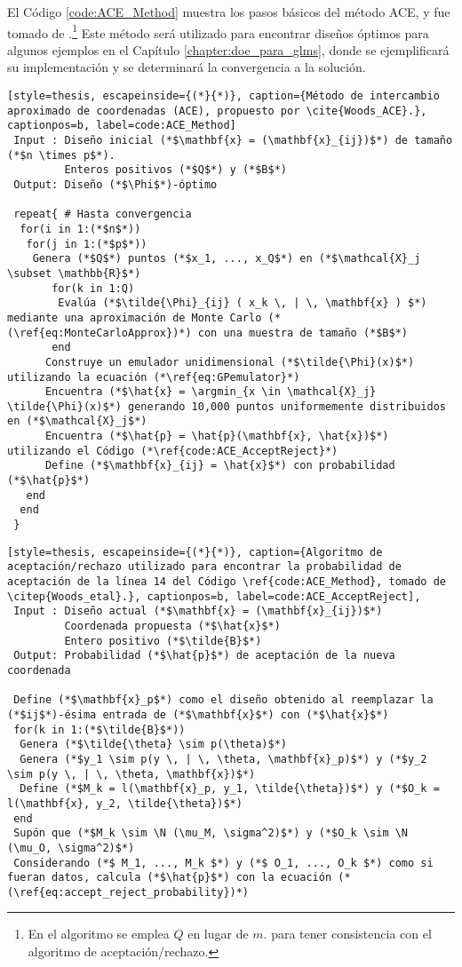 El Código \ref{code:ACE_Method} muestra los pasos básicos del método ACE, y fue tomado de \citep{Woods_etal}.\footnote{En el algoritmo se emplea $Q$ en lugar de $m$. para tener consistencia con el algoritmo de aceptación/rechazo.} Este método será utilizado para encontrar diseños óptimos para algunos ejemplos en el Capítulo \ref{chapter:doe_para_glms}, donde se ejemplificará su implementación y se determinará la convergencia a la solución.

\vskip 0.5cm

\begin{lstlisting}[style=thesis, escapeinside={(*}{*)}, caption={Método de intercambio aproximado de coordenadas (ACE), propuesto por \cite{Woods_ACE}.}, captionpos=b, label=code:ACE_Method]
 Input : Diseño inicial (*$\mathbf{x} = (\mathbf{x}_{ij})$*) de tamaño (*$n \times p$*).
         Enteros positivos (*$Q$*) y (*$B$*)
 Output: Diseño (*$\Phi$*)-óptimo
 
 repeat{ # Hasta convergencia
  for(i in 1:(*$n$*))
   for(j in 1:(*$p$*))
    Genera (*$Q$*) puntos (*$x_1, ..., x_Q$*) en (*$\mathcal{X}_j \subset \mathbb{R}$*)
       for(k in 1:Q)
        Evalúa (*$\tilde{\Phi}_{ij} ( x_k \, | \, \mathbf{x} ) $*) mediante una aproximación de Monte Carlo (*(\ref{eq:MonteCarloApprox})*) con una muestra de tamaño (*$B$*)
       end
      Construye un emulador unidimensional (*$\tilde{\Phi}(x)$*) utilizando la ecuación (*\ref{eq:GPemulator}*)
      Encuentra (*$\hat{x} = \argmin_{x \in \mathcal{X}_j} \tilde{\Phi}(x)$*) generando 10,000 puntos uniformemente distribuidos en (*$\mathcal{X}_j$*)
      Encuentra (*$\hat{p} = \hat{p}(\mathbf{x}, \hat{x})$*) utilizando el Código (*\ref{code:ACE_AcceptReject}*)
      Define (*$\mathbf{x}_{ij} = \hat{x}$*) con probabilidad (*$\hat{p}$*)
   end
  end
 }
\end{lstlisting}

\vskip 0.5cm

\begin{lstlisting}[style=thesis, escapeinside={(*}{*)}, caption={Algoritmo de aceptación/rechazo utilizado para encontrar la probabilidad de aceptación de la línea 14 del Código \ref{code:ACE_Method}, tomado de \citep{Woods_etal}.}, captionpos=b, label=code:ACE_AcceptReject],
 Input : Diseño actual (*$\mathbf{x} = (\mathbf{x}_{ij})$*)
         Coordenada propuesta (*$\hat{x}$*)
         Entero positivo (*$\tilde{B}$*)
 Output: Probabilidad (*$\hat{p}$*) de aceptación de la nueva coordenada
 
 Define (*$\mathbf{x}_p$*) como el diseño obtenido al reemplazar la (*$ij$*)-ésima entrada de (*$\mathbf{x}$*) con (*$\hat{x}$*)
 for(k in 1:(*$\tilde{B}$*))
  Genera (*$\tilde{\theta} \sim p(\theta)$*)
  Genera (*$y_1 \sim p(y \, | \, \theta, \mathbf{x}_p)$*) y (*$y_2 \sim p(y \, | \, \theta, \mathbf{x})$*)
  Define (*$M_k = l(\mathbf{x}_p, y_1, \tilde{\theta})$*) y (*$O_k = l(\mathbf{x}, y_2, \tilde{\theta})$*)
 end
 Supón que (*$M_k \sim \N (\mu_M, \sigma^2)$*) y (*$O_k \sim \N (\mu_O, \sigma^2)$*)
 Considerando (*$ M_1, ..., M_k $*) y (*$ O_1, ..., O_k $*) como si fueran datos, calcula (*$\hat{p}$*) con la ecuación (*(\ref{eq:accept_reject_probability})*)
\end{lstlisting}




